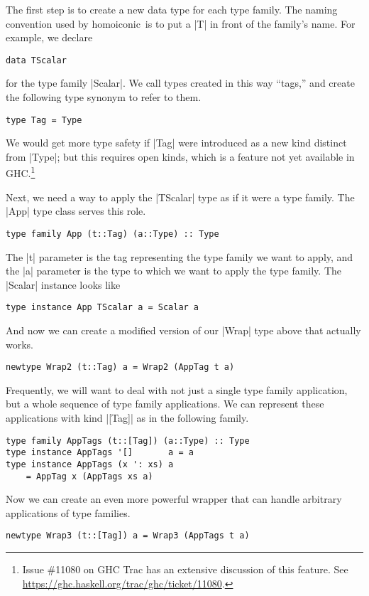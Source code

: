 \documentclass[preprint]{sigplanconf}
\theoremstyle{definition}
\newcommand{\homoiconic}{{\ttfamily homoiconic}~}
\begin{document}
The first step is to create a new data type for each type family.
The naming convention used by \homoiconic is to put a |T| in front of the family's name.
For example, we declare
\begin{lstlisting}
data TScalar
\end{lstlisting}
for the type family |Scalar|.
We call types created in this way ``tags,''
and create the following type synonym to refer to them.
\begin{lstlisting}
type Tag = Type
\end{lstlisting}
We would get more type safety if |Tag| were introduced as a new kind distinct from |Type|;
but this requires open kinds, which is a feature not yet available in GHC.\footnote{
    Issue \#11080 on GHC Trac has an extensive discussion of this feature.
    See \url{https://ghc.haskell.org/trac/ghc/ticket/11080}.
}

Next, we need a way to apply the |TScalar| type as if it were a type family.
The |App| type class serves this role.
\begin{lstlisting}
type family App (t::Tag) (a::Type) :: Type
\end{lstlisting}
The |t| parameter is the tag representing the type family we want to apply,
and the |a| parameter is the type to which we want to apply the type family.
The |Scalar| instance looks like
\begin{lstlisting}
type instance App TScalar a = Scalar a
\end{lstlisting}
And now we can create a modified version of our |Wrap| type above that actually works.
\begin{lstlisting}
newtype Wrap2 (t::Tag) a = Wrap2 (AppTag t a)
\end{lstlisting}

Frequently, we will want to deal with not just a single type family application,
but a whole sequence of type family applications.
We can represent these applications with kind |[Tag]| as in the following family.
\begin{lstlisting}
type family AppTags (t::[Tag]) (a::Type) :: Type
type instance AppTags '[]       a = a
type instance AppTags (x ': xs) a
    = AppTag x (AppTags xs a)
\end{lstlisting}
Now we can create an even more powerful wrapper that can handle arbitrary applications of type families.
\begin{lstlisting}
newtype Wrap3 (t::[Tag]) a = Wrap3 (AppTags t a)
\end{lstlisting}
\end{document}
